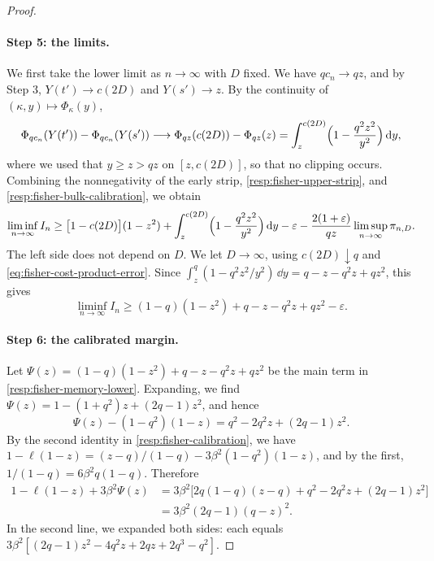 \begin{proof}
\paragraph{Step 5: the limits.}
We first take the lower limit as $n\to\infty$ with $D$ fixed. We have $qc_n\to qz$, and by Step 3, $Y(t')\to c(2D)$ and $Y(s')\to z$. By the continuity of $(\kappa,y)\mapsto\Phi_\kappa(y)$,
\[
 \Phi_{qc_n}(Y(t'))-\Phi_{qc_n}(Y(s'))\longrightarrow\Phi_{qz}(c(2D))-\Phi_{qz}(z)=\int_z^{c(2D)}\Bigl(1-\frac{q^2z^2}{y^2}\Bigr)\mathop{}\!\mathrm d y,
\]
where we used that $y\ge z>qz$ on $[z,c(2D)]$, so that no clipping occurs. Combining the nonnegativity of the early strip, \eqref{resp:fisher-upper-strip}, and \eqref{resp:fisher-bulk-calibration}, we obtain
\[
 \liminf_{n\to\infty}I_n\ge\bigl[1-c(2D)\bigr](1-z^2)+\int_z^{c(2D)}\Bigl(1-\frac{q^2z^2}{y^2}\Bigr)\mathop{}\!\mathrm d y-\varepsilon-\frac{2(1+\varepsilon)}{qz}\limsup_{n\to\infty}\pi_{n,D} .
\]
The left side does not depend on $D$. We let $D\to\infty$, using $c(2D)\downarrow q$ and \eqref{eq:fisher-cost-product-error}. Since $\int_z^q(1-q^2z^2/y^2)\,\dd y=q-z-q^2z+qz^2$, this gives
\begin{equation}
 \liminf_{n\to\infty}I_n\ge(1-q)(1-z^2)+q-z-q^2z+qz^2-\varepsilon .
 \label{resp:fisher-memory-lower}
\end{equation}

\paragraph{Step 6: the calibrated margin.}
Let $\Psi(z)=(1-q)(1-z^2)+q-z-q^2z+qz^2$ be the main term in \eqref{resp:fisher-memory-lower}. Expanding, we find $\Psi(z)=1-(1+q^2)z+(2q-1)z^2$, and hence
\[
 \Psi(z)-(1-q^2)(1-z)=q^2-2q^2z+(2q-1)z^2 .
\]
By the second identity in \eqref{resp:fisher-calibration}, we have $1-\ell(1-z)=(z-q)/(1-q)-3\beta^2(1-q^2)(1-z)$, and by the first, $1/(1-q)=6\beta^2q(1-q)$. Therefore
\begin{equation}\label{eq:fisher-cost-calibrated-margin}
 \begin{split}
 1-\ell(1-z)+3\beta^2\Psi(z)
 &=3\beta^2\bigl[2q(1-q)(z-q)+q^2-2q^2z+(2q-1)z^2\bigr]\\
 &=3\beta^2(2q-1)(q-z)^2 .
 \end{split}
\end{equation}
In the second line, we expanded both sides: each equals $3\beta^2[(2q-1)z^2-4q^2z+2qz+2q^3-q^2]$.


\end{proof}
